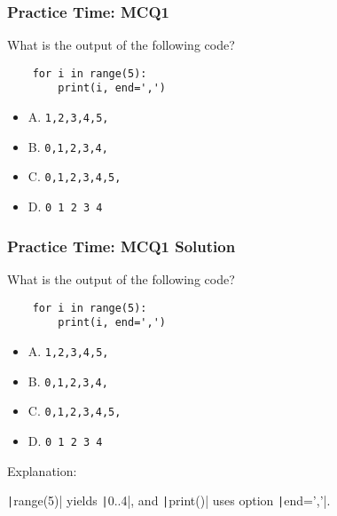\documentclass{beamer}
\begin{document}
\begin{frame}[fragile]
    \frametitle{Practice Time: MCQ1}
    What is the output of the following code?
    \begin{verbatim}
    for i in range(5):
        print(i, end=',')
    \end{verbatim}
    \begin{itemize}
        \item A. \texttt{1,2,3,4,5,}
        \item B. \texttt{0,1,2,3,4,}
        \item C. \texttt{0,1,2,3,4,5,}
        \item D. \texttt{0 1 2 3 4}
    \end{itemize}
\end{frame}
\begin{frame}[fragile]
    \frametitle{Practice Time: MCQ1 Solution}
    What is the output of the following code?
    \begin{verbatim}
    for i in range(5):
        print(i, end=',')
    \end{verbatim}
    \begin{itemize}
        \item A. \texttt{1,2,3,4,5,}
        \item \alert{B. \texttt{0,1,2,3,4,}}
        \item C. \texttt{0,1,2,3,4,5,}
        \item D. \texttt{0 1 2 3 4}
    \end{itemize}

    Explanation:

    \texttt|range(5)| yields \texttt|0..4|, and
    \texttt|print()| uses option \texttt|end=','|.
\end{frame}
\end{document}
